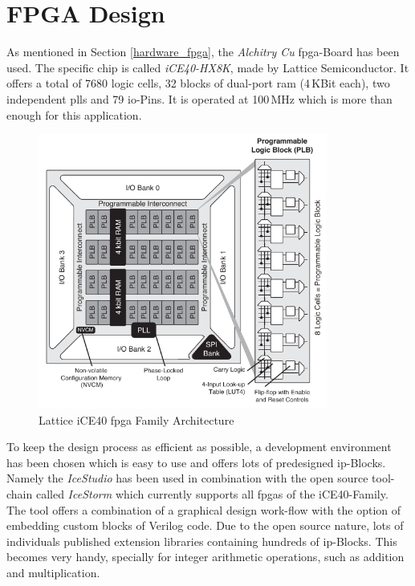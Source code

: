 \section{FPGA Design}
As mentioned in Section \ref{hardware_fpga}, the \textit{Alchitry Cu} \acrshort{fpga}-Board has been used. The specific chip is called \textit{iCE40-HX8K}, made by Lattice Semiconductor. It offers a total of 7680 logic cells, 32 blocks of dual-port \acrshort{ram} (4\,KBit each), two independent \acrshort{pll}s and 79 \acrshort{io}-Pins. It is operated at 100\,MHz which is more than enough for this application.

\begin{figure}[h!]
	\centering
	\includegraphics[width=9.5cm]{images/4_Design/FPGA/iCE40LPHXFamilyDataSheet.pdf}
	\vspace{0.0cm}
    \caption{Lattice iCE40 \acrshort{fpga} Family Architecture \cite{lattice_ice40_fpga_architecture}}
    \label{fig:rc-snubber}
\end{figure}

To keep the design process as efficient as possible, a development environment has been chosen which is easy to use and offers lots of predesigned \acrshort{ip}-Blocks. Namely the \mbox{\textit{IceStudio}} has been used in combination with the open source tool-chain called \textit{IceStorm} which currently supports all \acrshort{fpga}s of the iCE40-Family.\\
The tool offers a combination of a graphical design work-flow with the option of embedding custom blocks of Verilog code. Due to the open source nature, lots of individuals published extension libraries containing hundreds of \acrshort{ip}-Blocks. This becomes very handy, specially for integer arithmetic operations, such as addition and multiplication.


